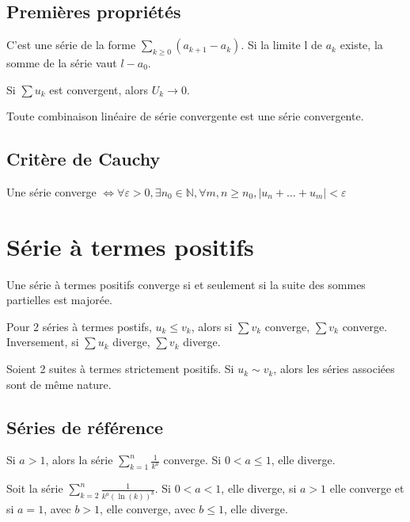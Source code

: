 \documentclass[french]{yLectureNote}
\begin{document}
\subsection{Premières propriétés}
\begin{proposition}
C'est une série de la forme \(\sum_{k\geq 0} (a_{k+1}-a_k)\). Si la limite l de \(a_k\) existe, la somme de la série vaut \(l-a_0\).
\end{proposition}
\begin{proposition}
Si $\sum u_k$ est convergent, alors $U_k \to 0$.
\end{proposition}

\begin{proposition}
Toute combinaison linéaire de série convergente est une série convergente.
\end{proposition}
\subsection{Critère de Cauchy}
\begin{proposition}
Une série converge \(\iff \forall \varepsilon >0, \exists n_0\in\mathbb{N}, \forall m,n \geq n_0, |u_n+\dots+u_m|<\varepsilon\)
\end{proposition}
\section{Série à termes positifs}
\begin{proposition}
Une série à termes positifs converge si et seulement si la suite des sommes partielles est majorée.
\end{proposition}
\begin{theorem}
 Pour 2 séries à termes postifs, \(u_k\leq v_k\), alors si \(\sum v_k\) converge,  \(\sum v_k\) converge. Inversement, si \(\sum u_k\) diverge, \(\sum v_k\) diverge.
\end{theorem}
\begin{theorem}
 Soient 2 suites à termes strictement positifs. Si \(u_k \sim v_k\), alors les séries associées sont de m\^eme nature.
\end{theorem}
\subsection{Séries de référence}
\begin{proposition}
Si \(a>1\), alors la série \(\sum_{k=1}^n \frac{1}{k^a}\) converge. Si \(0<a\leq 1\), elle diverge.
\end{proposition}
\begin{proposition}
Soit la série \(\sum_{k=2}^n \frac{1}{k^a(\ln(k))^b}\). Si \(0<a<1\), elle diverge, si \(a>1\) elle converge et si \(a=1\), avec \(b>1\), elle converge, avec \(b\leq 1\), elle diverge.
\end{proposition}
\end{document}
